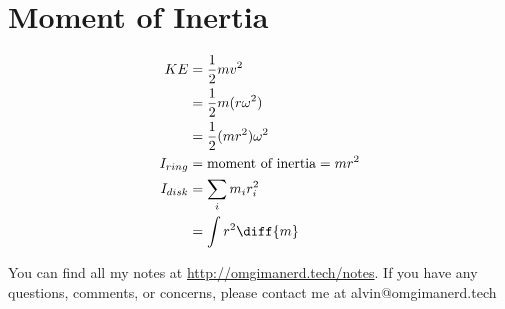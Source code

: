 \documentclass{math}
\begin{document}
\section*{Moment of Inertia}
\begin{align*}
  KE &= \frac{1}{2}mv^2 \\
  &= \frac{1}{2}m(r\omega^2) \\
  &= \frac{1}{2}(mr^2)\omega^2 \\
  I_{ring} &= \text{moment of inertia} = mr^2 \\
  I_{disk} &= \sum_{i}m_ir_i^2 \\
  &= \int r^2\diff{m}
\end{align*}

\begin{center}
  You can find all my notes at \url{http://omgimanerd.tech/notes}. If you have
  any questions, comments, or concerns, please contact me at
  alvin@omgimanerd.tech
\end{center}
\end{document}
